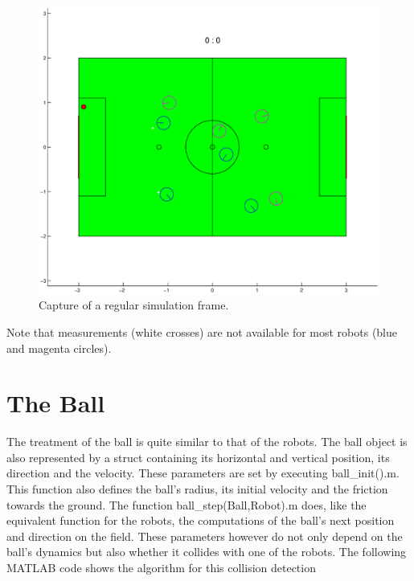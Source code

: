 \begin{figure}[htbp]
	\centering
    	\includegraphics[width=12cm]{./2_Simulation/plot_robots}
  	\caption{Capture of a regular simulation frame.}
  	\label{Plot_robots}
\end{figure}

Note that measurements (white crosses) are not available for most robots (blue and magenta circles).


\section{The Ball}

The treatment of the ball is quite similar to that of the robots. The ball object is also represented by a struct containing its horizontal and vertical position, its direction and the velocity. These parameters are set by executing {\selectfont ball\_init().m}. This function also defines the ball's radius, its initial velocity and the friction towards the ground. The function {\selectfont ball\_step(Ball,Robot).m} does, like the equivalent function for the robots, the computations of the ball's next position and direction on the field. These parameters however do not only depend on the ball's dynamics but also whether it collides with one of the robots. The following MATLAB code shows the algorithm for this collision detection


\parskip 20pt

